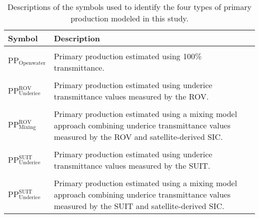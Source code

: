 \begin{table}[]
	\centering
	\begin{tabular}{l L{12cm}}
		\toprule
		\textbf{Symbol}                             & \textbf{Description}                                                                                                                               \\
		\toprule                                                                                                                                                                                         \\
		$\text{PP}_\text{Openwater}$                & Primary production estimated using 100\% transmittance.                                                                                            \\
		\hline                                                                                                                                                                                           \\
		$\text{PP}^{\text{ROV}}_{\text{Underice}}$  & Primary production estimated using underice transmittance values measured by the ROV.                                                              \\
		\hline                                                                                                                                                                                           \\
		$\text{PP}^{\text{ROV}}_{\text{Mixing}}$    & Primary production estimated using a mixing model approach combining underice transmittance values measured by the ROV and satellite-derived SIC.  \\
		\hline                                                                                                                                                                                           \\
		$\text{PP}^{\text{SUIT}}_{\text{Underice}}$ & Primary production estimated using underice transmittance values measured by the SUIT.                                                             \\
		\hline                                                                                                                                                                                           \\
		$\text{PP}^{\text{SUIT}}_{\text{Underice}}$ & Primary production estimated using a mixing model approach combining underice transmittance values measured by the SUIT and satellite-derived SIC. \\
		\toprule
	\end{tabular}
	\caption{Descriptions of the symbols used to identify the four types of primary production modeled in this study.}
\end{table}